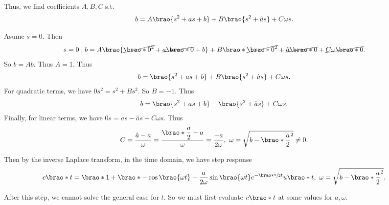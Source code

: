 \documentclass[12pt]{article}
\DeclarePairedDelimiter\brao()%
\begin{document}
\begin{enumerate}[(a)]
        Thus, we find coefficients $A,B,C$ s.t.
        \begin{equation}
            b = A\brao{s^2 + as + b} + B\brao{s^2 + \hat{a}s} + C\omega s.
        \end{equation}

        Asume $s = 0$. Then
        \begin{equation}
            s = 0: b = A\brao{\cancel{\brao*0^2} + \cancel{a\brao*0} + b} + B\brao*{\cancel{\brao*0^2} + \cancel{\hat{a}\brao*0}} + \cancel{C\omega \brao*0}.
        \end{equation}
        So $b = Ab$. Thus $A = 1$. Thus
        \begin{equation}
            b = \brao{s^2 + as + b} + B\brao{s^2 + \hat{a}s} + C\omega s.
        \end{equation}
        For quadratic terms, we have $0s^2 = s^2 + Bs^2$. So $B = -1$. Thus
        \begin{equation}
            b = \brao{s^2 + as + b} - \brao{s^2 + \hat{a}s} + C\omega s.
        \end{equation}
        Finally, for linear terms, we have $0s = as - \hat{a}s + C\omega s$. Thus
        \begin{equation}
            C = \frac{\hat{a} - a}\omega
            = \frac{\displaystyle\brao*{\frac{a}2} - a}\omega
            = \frac{-a}{2\omega},\ 
            \omega = \sqrt{b - \brao*{\frac{a}2}^2} \not= 0.
        \end{equation}

        Then by the inverse Laplace transform, in the time domain, we have step response
        \begin{equation}
            \begin{aligned}
                c\brao*t = \brao*{1 + \brao*{-\cos\brao{\omega t} - \frac{a}{2\omega} \sin\brao{\omega t} }{e^{-\brao*{\sfrac{a}2}t}}}u\brao*t,\ 
                \omega = \sqrt{b - \brao*{\frac{a}2}^2}.
            \end{aligned}
        \end{equation}

        After this step, we cannot solve the general case for $t$. So we must first evaluate $c\brao*t$ at some values for $a, \omega$.


\end{enumerate}
\end{document}
